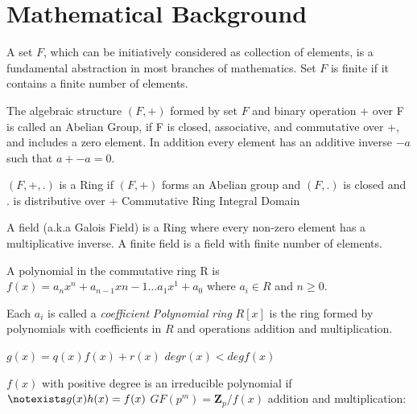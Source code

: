 \chapter{Mathematical Background}

A set $F$, which can be initiatively considered as collection of elements, is a fundamental abstraction in most branches of mathematics.
Set $F$ is finite if it contains a finite number of elements.

The algebraic structure $(F, +)$ formed by set $F$ and binary operation + over F is called an Abelian Group, if F is closed, 
associative, and commutative over +, and includes a zero element. In addition every element has an additive inverse 
$-a$ such that $a + -a = 0$. 

$(F, +, .)$ is a Ring if $(F, +)$ forms an Abelian group and $(F, .)$ is closed and . is distributive over +
Commutative Ring
Integral Domain 


A field (a.k.a Galois Field) is a Ring where every non-zero element has a multiplicative inverse. A finite field is a field with
finite number of elements. 

A polynomial in the commutative ring R is $f(x) = a_n x^n + a_{n-1}x{n-1} \dots a_1 x^1 + a_0$ where $a_i \in R$ and $n \geq 0$.

Each $a_i$ is called a \emph{coefficient}
\emph{Polynomial ring} $R[x]$ is the ring formed by polynomials with coefficients in $R$ and operations addition and multiplication.

$g(x) = q(x) f(x) + r(x) $ $deg r(x) < deg f(x)$

$f(x)$ with positive degree is an irreducible polynomial if $\notexists g(x)h(x) = f(x)$
$ GF(p^m) = \mathbf{Z}_p/f(x)$ 
addition and multiplication:






